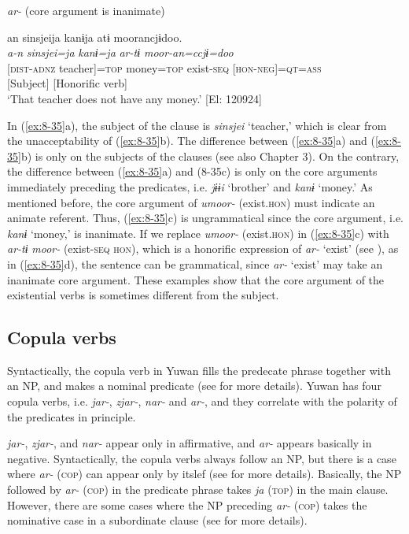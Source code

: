 \ex \textit{ar-} (core argument is inanimate)

{\TM}
\gllll  an  sinsjeija  kanɨja  atɨ  moorancjɨdoo.\\
\textit{a-n}  \textit{sinsjei=ja}  \textit{kanɨ=ja}  \textit{ar-tɨ  moor-an=ccjɨ=doo}\\
{}[\textsc{dist}-\textsc{adnz}  teacher]=\textsc{top}  money=\textsc{top}  exist-\textsc{seq}  [\textsc{hon}-\textsc{neg}]=\textsc{qt}=\textsc{ass}\\
{}[Subject]        [Honorific verb]\\
\glt ‘That teacher does not have any money.’ [El: 120924]
\z
\z

In (\ref{ex:8-35}a), the subject of the clause is \textit{sinsjei} ‘teacher,’ which is clear from the unacceptability of (\ref{ex:8-35}b). The difference between (\ref{ex:8-35}a) and (\ref{ex:8-35}b) is only on the subjects of the clauses (see also Chapter 3). On the contrary, the difference between (\ref{ex:8-35}a) and (8-35c) is only on the core arguments immediately preceding the predicates, i.e. \textit{jɨɨi} ‘brother’ and \textit{kanɨ} ‘money.’ As mentioned before, the core argument of \textit{umoor-} (exist.\textsc{hon}) must indicate an animate referent. Thus, (\ref{ex:8-35}c) is ungrammatical since the core argument, i.e. \textit{kanɨ} ‘money,’ is inanimate. If we replace \textit{umoor-} (exist.\textsc{hon}) in (\ref{ex:8-35}c) with \textit{ar-tɨ} \textit{moor-} (exist-\textsc{seq} \textsc{hon}), which is a honorific expression of \textit{ar-} ‘exist’ (see ), as in (\ref{ex:8-35}d), the sentence can be grammatical, since \textit{ar-} ‘exist’ may take an inanimate core argument. These examples show that the core argument of the existential verbs is sometimes different from the subject.

\subsection{Copula verbs}

Syntactically, the copula verb in Yuwan fills the predecate phrase together with an NP, and makes a nominal predicate (see  for more details). Yuwan has four copula verbs, i.e. \textit{jar-}, \textit{zjar-}, \textit{nar-} and \textit{ar-}, and they correlate with the polarity of the predicates in principle.

  \textit{jar-}, \textit{zjar-}, and \textit{nar-} appear only in affirmative, and \textit{ar-} appears basically in negative. Syntactically, the copula verbs always follow an NP, but there is a case where \textit{ar-} (\textsc{cop}) can appear only by itslef (see  for more details). Basically, the NP followed by \textit{ar-} (\textsc{cop}) in the predicate phrase takes \textit{ja} (\textsc{top}) in the main clause. However, there are some cases where the NP preceding \textit{ar-} (\textsc{cop}) takes the nominative case in a subordinate clause (see  for more details).

